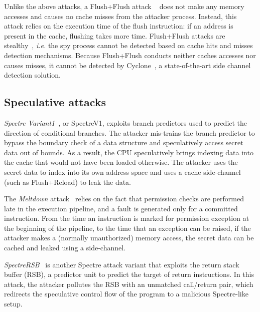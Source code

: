 Unlike the above attacks, a Flush+Flush attack ~\cite{GrussFlushFlush} does 
not make any memory accesses and causes no cache misses from the attacker process. 
Instead, this attack relies on the execution time of the flush instruction: 
if an address is present in the cache, flushing takes more time. 
Flush+Flush attacks are stealthy~\cite{GrussFlushFlush}, {\em i.e.} the spy process 
cannot be detected based on cache hits and misses detection 
mechanisms\cite{GrussFlushFlush}. Because Flush+Flush conducts neither
caches accesses nor causes misses, it cannot be detected by Cyclone~\cite{cyclone2019},
a state-of-the-art side channel detection solution.  

\subsection{Speculative attacks}
\textit{Spectre Variant1}~\cite{spectre}, or SpectreV1, exploits branch predictors 
used to predict the direction of conditional branches. The attacker mis-trains 
the branch predictor to bypass the boundary check of a data structure and 
speculatively access secret data out of bounds. As a result, the CPU 
speculatively brings indexing data into the cache that would not have 
been loaded otherwise. The attacker uses the secret data to index 
into its own address space and uses a cache side-channel (such as 
Flush+Reload) to leak the data. 

The \textit{Meltdown} attack~\cite{meltdown} relies on the fact that permission
checks are performed late in the execution pipeline, and a fault is generated only 
for a committed instruction. From the time an instruction is marked for permission
exception at the beginning of the pipeline, to the time that an exception can be raised, 
if the attacker makes a (normally unauthorized) memory access, the secret data can be 
cached and leaked using a side-channel.

\textit{SpectreRSB}~\cite{koruyeh2018spectre} is another Spectre attack variant
that exploits the return stack buffer (RSB), a predictor unit to predict the target of 
return instructions. In this attack, the attacker pollutes the RSB with an unmatched 
call/return pair, which redirects the speculative control flow of the program to 
a malicious Spectre-like setup.

